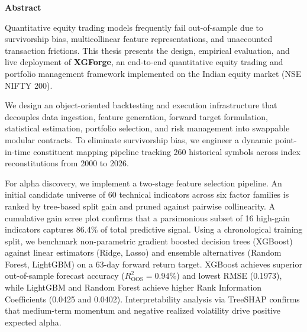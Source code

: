 \begin{flushright}
\huge{\textbf{Abstract}}
\end{flushright}

Quantitative equity trading models frequently fail out-of-sample due to survivorship bias, multicollinear feature representations, and unaccounted transaction frictions. This thesis presents the design, empirical evaluation, and live deployment of \textbf{XGForge}, an end-to-end quantitative equity trading and portfolio management framework implemented on the Indian equity market (NSE NIFTY 200). 

We design an object-oriented backtesting and execution infrastructure that decouples data ingestion, feature generation, forward target formulation, statistical estimation, portfolio selection, and risk management into swappable modular contracts. To eliminate survivorship bias, we engineer a dynamic point-in-time constituent mapping pipeline tracking 260 historical symbols across index reconstitutions from 2000 to 2026. 

For alpha discovery, we implement a two-stage feature selection pipeline. An initial candidate universe of 60 technical indicators across six factor families is ranked by tree-based split gain and pruned against pairwise collinearity. A cumulative gain scree plot confirms that a parsimonious subset of 16 high-gain indicators captures 86.4\% of total predictive signal. Using a chronological training split, we benchmark non-parametric gradient boosted decision trees (XGBoost) against linear estimators (Ridge, Lasso) and ensemble alternatives (Random Forest, LightGBM) on a 63-day forward return target. XGBoost achieves superior out-of-sample forecast accuracy ($R^2_{\text{OOS}} = 0.94\%$) and lowest RMSE (0.1973), while LightGBM and Random Forest achieve higher Rank Information Coefficients (0.0425 and 0.0402). Interpretability analysis via TreeSHAP confirms that medium-term momentum and negative realized volatility drive positive expected alpha.

